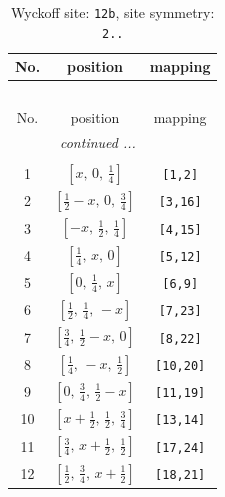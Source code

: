 \documentclass[fleqn,8pt]{jsarticle}
\begin{document}
\begin{longtable}{ccc}
\caption{Wyckoff site: {\tt 12b}, site symmetry: {\tt 2..}}
 \\
 \hline \hline
No. & position & mapping \\ \hline \endfirsthead

\multicolumn{2}{l}{\tablename\ \thetable{}} \\
 \hline \hline
No. & position & mapping \\ \hline \endhead

 \hline \hline
\multicolumn{2}{r}{\footnotesize\it continued ...} \\ \endfoot

 \hline \hline
\multicolumn{2}{r}{} \\ \endlastfoot

1 & $\left[ x,\, 0,\, \frac{1}{4} \right]$ & {\tt [1,2]} \\ \hline
2 & $\left[ \frac{1}{2} - x,\, 0,\, \frac{3}{4} \right]$ & {\tt [3,16]} \\ \hline
3 & $\left[ - x,\, \frac{1}{2},\, \frac{1}{4} \right]$ & {\tt [4,15]} \\ \hline
4 & $\left[ \frac{1}{4},\, x,\, 0 \right]$ & {\tt [5,12]} \\ \hline
5 & $\left[ 0,\, \frac{1}{4},\, x \right]$ & {\tt [6,9]} \\ \hline
6 & $\left[ \frac{1}{2},\, \frac{1}{4},\, - x \right]$ & {\tt [7,23]} \\ \hline
7 & $\left[ \frac{3}{4},\, \frac{1}{2} - x,\, 0 \right]$ & {\tt [8,22]} \\ \hline
8 & $\left[ \frac{1}{4},\, - x,\, \frac{1}{2} \right]$ & {\tt [10,20]} \\ \hline
9 & $\left[ 0,\, \frac{3}{4},\, \frac{1}{2} - x \right]$ & {\tt [11,19]} \\ \hline
10 & $\left[ x + \frac{1}{2},\, \frac{1}{2},\, \frac{3}{4} \right]$ & {\tt [13,14]} \\ \hline
11 & $\left[ \frac{3}{4},\, x + \frac{1}{2},\, \frac{1}{2} \right]$ & {\tt [17,24]} \\ \hline
12 & $\left[ \frac{1}{2},\, \frac{3}{4},\, x + \frac{1}{2} \right]$ & {\tt [18,21]} \\
\end{longtable}
\renewcommand{\arraystretch}{1.2}
\end{document}
